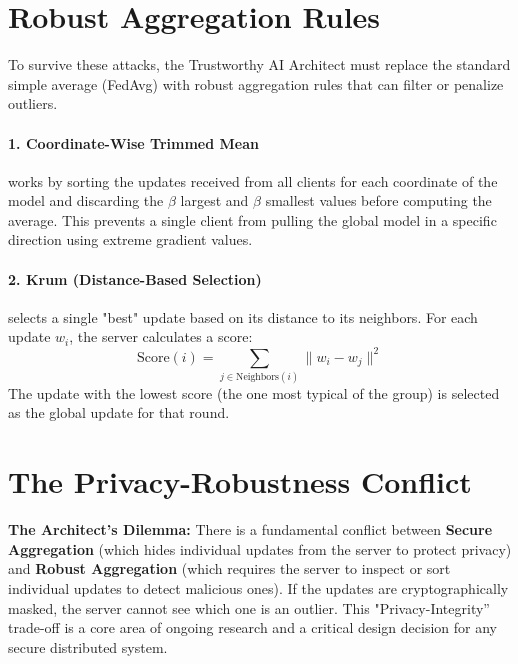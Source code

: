 \section{Robust Aggregation Rules}
\label{sec:aggregation_rules}

To survive these attacks, the Trustworthy AI Architect must replace the standard simple average (FedAvg) with robust aggregation rules that can filter or penalize outliers.

\paragraph{1. Coordinate-Wise Trimmed Mean} works by sorting the updates received from all clients for each coordinate of the model and discarding the $\beta$ largest and $\beta$ smallest values before computing the average. This prevents a single client from pulling the global model in a specific direction using extreme gradient values.

\paragraph{2. Krum (Distance-Based Selection)} selects a single "best" update based on its distance to its neighbors. For each update $w_i$, the server calculates a score:
\begin{equation}
\text{Score}(i) = \sum_{j \in \text{Neighbors}(i)} \|w_i - w_j\|^2
\end{equation}
The update with the lowest score (the one most typical of the group) is selected as the global update for that round.

\section{The Privacy-Robustness Conflict}
\label{sec:privacy_robustness_conflict}

\begin{svgraybox}
\textbf{The Architect's Dilemma:} There is a fundamental conflict between \textbf{Secure Aggregation} (which hides individual updates from the server to protect privacy) and \textbf{Robust Aggregation} (which requires the server to inspect or sort individual updates to detect malicious ones). If the updates are cryptographically masked, the server cannot see which one is an outlier. This "Privacy-Integrity'' trade-off is a core area of ongoing research and a critical design decision for any secure distributed system.
\end{svgraybox}

